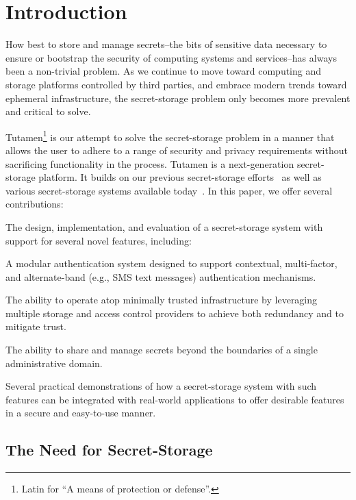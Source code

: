 \section{Introduction}
\label{sec:intro}

How best to store and manage secrets--the bits of sensitive data
necessary to ensure or bootstrap the security of computing systems and
services--has always been a non-trivial problem. As we continue to
move toward computing and storage platforms controlled by third
parties, and embrace modern trends toward ephemeral infrastructure,
the secret-storage problem only becomes more prevalent and critical to
solve.

Tutamen\footnote{Latin for ``A means of protection or defense''.} is
our attempt to solve the secret-storage problem in a manner that
allows the user to adhere to a range of security and privacy
requirements without sacrificing functionality in the process. Tutamen
is a next-generation secret-storage platform. It builds on our
previous secret-storage efforts~\cite{custos-trios} as well as various
secret-storage systems available today~\cite{vault, keywhiz,
  confidant}. In this paper, we offer several contributions:

\begin{packed_item}
\item The design, implementation, and evaluation of a secret-storage
  system with support for several novel features, including:
  \begin{packed_item}
  \item A modular authentication system designed to support
    contextual, multi-factor, and alternate-band (e.g., SMS text
    messages) authentication mechanisms.
  \item The ability to operate atop minimally trusted infrastructure
    by leveraging multiple storage and access control providers to
    achieve both redundancy and to mitigate trust.
  \item The ability to share and manage secrets beyond the boundaries
    of a single administrative domain.
  \end{packed_item}
\item Several practical demonstrations of how a secret-storage system
  with such features can be integrated with real-world applications to
  offer desirable features in a secure and easy-to-use manner.
\end{packed_item}

\subsection{The Need for Secret-Storage}

